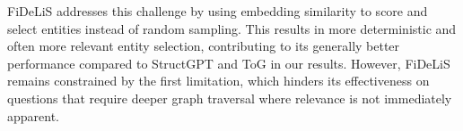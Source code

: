 FiDeLiS addresses this challenge by using embedding similarity to score and select entities instead of random sampling. This results in more deterministic and often more relevant entity selection, contributing to its generally better performance compared to StructGPT and ToG in our results. However, FiDeLiS remains constrained by the first limitation, which hinders its effectiveness on questions that require deeper graph traversal where relevance is not immediately apparent.







